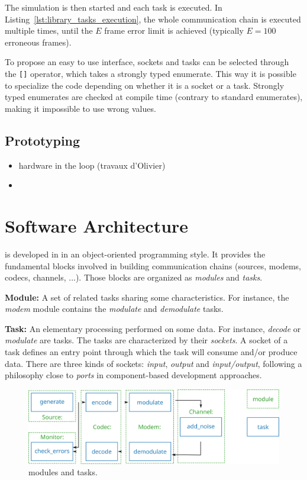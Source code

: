 The simulation is then started and each task is executed. In
Listing~\ref{lst:library_tasks_execution}, the whole communication chain is
executed multiple times, until the $E$ frame error limit is achieved (typically
$E = 100$ erroneous frames).

To propose an easy to use interface, sockets and tasks can be selected through
the \verb|[]| operator, which takes a \Cxx strongly typed enumerate. This way it
is possible to specialize the code depending on whether it is a socket or a
task. Strongly typed enumerates are checked at compile time (contrary to
standard enumerates), making it impossible to use wrong values.

\subsection{Prototyping}

\begin{itemize}
  \item hardware in the loop (travaux d'Olivier)
  \item \cite{Cassagne2017,Cassagne2017a}
\end{itemize}

\section{Software Architecture}
\label{sec:soft_archi}

\AFFECT is developed in \Cxx in an object-oriented programming style. It
provides the fundamental blocks involved in building communication chains
(sources, modems, codecs, channels, ...). Those blocks are organized as
\textit{modules} and \textit{tasks}.

\textbf{Module:} A set of related tasks sharing some characteristics. For
instance, the \textit{modem} module contains the \textit{modulate} and
\textit{demodulate} tasks.

\textbf{Task:} An elementary processing performed on some data. For instance,
\textit{decode} or \textit{modulate} are tasks. The tasks are characterized by
their \textit{sockets}. A socket of a task defines an entry point through which
the task will consume and/or produce data. There are three kinds of sockets:
\textit{input}, \textit{output} and \textit{input/output}, following a
philosophy close to \emph{ports} in component-based development approaches.

\begin{figure}[htp]
  \centering
  \includegraphics[width=0.70\linewidth]{soft_archi/com_chain_task_module}
  \caption{\AFFECT modules and tasks.}
  \label{fig:soft_archi_com_chain_task_module}
\end{figure}


